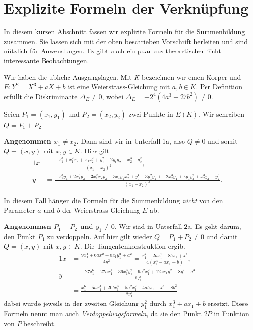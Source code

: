 \section{Explizite Formeln der Verknüpfung}

In diesem kurzen Abschnitt fassen wir explizite Formeln für die
Summenbildung zusammen. Sie lassen sich mit der oben beschrieben
Vorschrift herleiten und sind nützlich für Anwendungen. Es gibt
auch ein paar aus theoretischer Sicht interessante Beobachtungen. 

Wir haben die übliche Ausgangslagen. Mit $K$ bezeichnen wir einen
Körper und $E: Y^2 = X^3+aX+b$ ist eine Weierstrass-Gleichung mit
$a,b\in K$. Per Definition erfüllt die Diskriminante $\Delta_E \not=
0$, wobei 
$\Delta_E=-2^4(4a^3+27b^2)\not=0$.

Seien $P_1 = (x_1,y_1)$ und $P_2 = (x_2,y_2)$ zwei Punkte in $E(K)$.
Wir schreiben $Q = P_1+P_2$. 

\bigskip
\textbf{Angenommen $x_1\not=x_2$.} Dann sind wir in Unterfall 1a, also
$Q\not=0$ und somit $Q = (x,y)$ mit $x,y\in K$. Hier gilt
\begin{alignat*}1
  x &= \frac{-x_1^3 + x_1^2x_2 + x_1x_2^2 + y_1^2 - 2y_1y_2 -x_2^3 +
    y_2^2}{(x_1-x_2)^2}, \\
  y &= \frac{-x_1^3 y_1 + 2x_1^3y_2 - 3x_1^2 x_2 y_2 + 3x_1y_1x_2^2 +
    y_1^3 - 3y_1^2y_2
    + -2x_2^3y_1 + 3y_1 y_2^2 + x_2^3y_2 - y_2^3}{(x_1-x_2)^3}.
\end{alignat*}

In diesem Fall hängen die Formeln für die Summenbildung  \emph{nicht}
von den Parameter $a$ und $b$ der Weierstrass-Gleichung $E$ ab.  

\bigskip
\textbf{Angenommen $P_1=P_2$ und $y_1\not=0$.} Wir sind in Unterfall
2a. Es geht darum, den Punkt $P_1$ zu verdoppeln. Auf hier gilt wieder
$Q=P_1+P_2\not=0$ und damit $Q=(x,y)$ mit $x,y\in K$.
Die Tangentenkonstruktion ergibt 
\begin{alignat*}1
  x &= \frac{9x_1^4+6ax_1^2-8x_1y_1^2+a^2}{4y_1^2} = \frac{x_1^4 - 2ax_1^2 - 8bx_1 + a^2
  }{4(x_1^3+ax_1+b)},\\
  y &=
  \frac{-27x_1^6-27ax_1^4+36x_1^3y_1^2-9a^2x_1^2+12ax_1y_1^2-8y_1^4-a^3}{8y_1^3}\\
  & =\frac{x_1^6+ 5ax_1^4 + 20bx_1^3- 5a^2x_1^2 -4abx_1 -a^3 -8b^2 }{8y_1^3}
\end{alignat*}
dabei wurde jeweils in der zweiten Gleichung  $y_1^2$ durch
$x_1^3+ax_1+b$ ersetzt.
Diese Formeln nennt man auch
\emph{Verdoppelungsformeln}, da sie den
Punkt $2P$ in Funktion von $P$ beschreibt.


